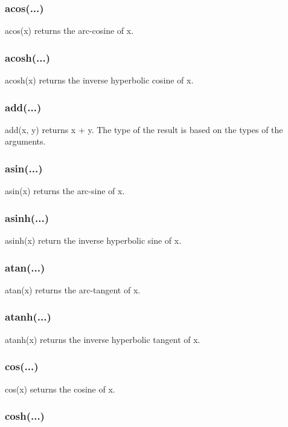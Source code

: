 \subsubsection{acos(...)}

acos(x) returns the arc-cosine of x.

\subsubsection{acosh(...)}

acosh(x) returns the inverse hyperbolic cosine of x.

\subsubsection{add(...)}

add(x, y) returns x + y. The type of the result is based on the types of the arguments.

\subsubsection{asin(...)}

asin(x) returns the arc-sine of x.

\subsubsection{asinh(...)}

asinh(x) return the inverse hyperbolic sine of x.

\subsubsection{atan(...)}

atan(x) returns the arc-tangent of x.

\subsubsection{atanh(...)}

atanh(x) returns the inverse hyperbolic tangent of x.

\subsubsection{cos(...)}

cos(x) seturns the cosine of x.

\subsubsection{cosh(...)}

